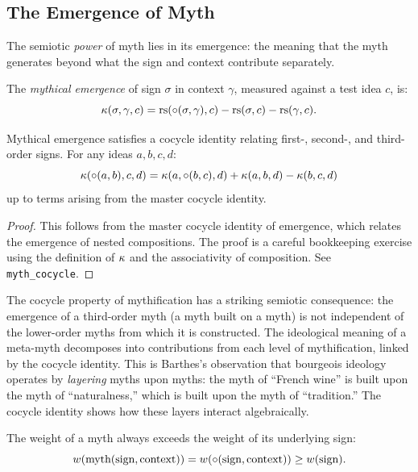 \subsection{The Emergence of Myth}

The semiotic \emph{power} of myth lies in its emergence: the meaning
that the myth generates beyond what the sign and context contribute
separately.

\begin{definition}
\label{def:mythical-emergence}
The \emph{mythical emergence} of sign $\sigma$ in context $\gamma$,
measured against a test idea $c$, is:
\[
  \kappa(\sigma, \gamma, c) =
  \mathrm{rs}(\circ(\sigma, \gamma), c) - \mathrm{rs}(\sigma, c) - \mathrm{rs}(\gamma, c).
\]
\end{definition}

\begin{theorem}
\label{thm:myth-cocycle}
Mythical emergence satisfies a cocycle identity relating first-,
second-, and third-order signs. For any ideas $a, b, c, d$:
\[
  \kappa(\circ(a,b), c, d) = \kappa(a, \circ(b,c), d)
  + \kappa(a, b, d) - \kappa(b, c, d)
\]
up to terms arising from the master cocycle identity.
\end{theorem}

\begin{proof}
This follows from the master cocycle identity of emergence, which
relates the emergence of nested compositions. The proof is a careful
bookkeeping exercise using the definition of $\kappa$ and the
associativity of composition. See \texttt{myth\_cocycle}.
\end{proof}

\begin{interpretation}
The cocycle property of mythification has a striking semiotic
consequence: the emergence of a third-order myth (a myth built on a
myth) is not independent of the lower-order myths from which it is
constructed. The ideological meaning of a meta-myth decomposes into
contributions from each level of mythification, linked by the cocycle
identity. This is Barthes's observation that bourgeois ideology
operates by \emph{layering} myths upon myths: the myth of ``French
wine'' is built upon the myth of ``naturalness,'' which is built upon
the myth of ``tradition.'' The cocycle identity shows how these layers
interact algebraically.
\end{interpretation}

\begin{theorem}
\label{thm:myth-weight-growth}
The weight of a myth always exceeds the weight of its underlying sign:
\[
  w(\text{myth}(\text{sign}, \text{context})) = w(\circ(\text{sign}, \text{context})) \geq w(\text{sign}).
\]
\end{theorem}

